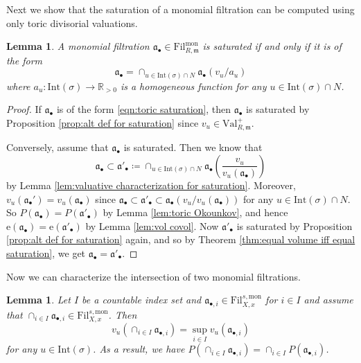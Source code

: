 \documentclass[11pt, leqno]{amsart}%
\theoremstyle{plain}
\newtheorem{lemma}[theorem]{Lemma}
\theoremstyle{definition}
\theoremstyle{remark}
\newcommand{\bR}{\mathbb{R}}
\newcommand{\fa}{\mathfrak{a}}
\newcommand{\fm}{\mathfrak{m}}
\newcommand{\Int}{\mathrm{Int}}
\newcommand{\Val}{\mathrm{Val}}
\newcommand{\e}{\mathrm{e}}
\newcommand{\Fil}{\mathrm{Fil}}
\numberwithin{equation}{section}
\begin{document}
Next we show that the saturation of a monomial filtration can be computed using only toric divisorial valuations.

\begin{lemma}\label{lem:toric saturation}
    A monomial filtration $\fa_\bullet\in\Fil^\mathrm{mon}_{R,\fm}$ is saturated if and only if it is of the form 
    \begin{equation}\label{eqn:toric saturation}
        \fa_\bullet=\cap_{u\in\Int(\sigma)\cap N}\fa_\bullet(v_u/a_u)
    \end{equation}
    where $a_u:\Int(\sigma)\to\bR_{>0}$ is a homogeneous function for any $u\in \Int(\sigma)\cap N$.
\end{lemma}

\begin{proof}
    If $\fa_\bullet$ is of the form \eqref{eqn:toric saturation}, then $\fa_\bullet$ is saturated by Proposition \ref{prop:alt def for saturation} since $v_u\in\Val^+_{R,\fm}$.

    Conversely, assume that $\fa_\bullet$ is saturated. Then we know that 
    \[
        \fa_\bullet\subset \fa'_\bullet\coloneqq\cap_{u\in\Int(\sigma)\cap N} \fa_\bullet(\frac{v_u}{v_u(\fa_\bullet)})
    \]
    by Lemma \ref{lem:valuative characterization for saturation}. Moreover, $v_u(\fa_\bullet')=v_u(\fa_\bullet)$ since $\fa_\bullet\subset\fa'_\bullet\subset\fa_\bullet(v_u/v_u(\fa_\bullet))$ for any $u\in \Int(\sigma)\cap N$. So $P(\fa_\bullet)=P(\fa'_\bullet)$ by Lemma \ref{lem:toric Okounkov}, and hence $\e(\fa_\bullet)=\e(\fa'_\bullet)$ by Lemma \ref{lem:vol covol}. Now $\fa'_\bullet$ is saturated by Proposition \ref{prop:alt def for saturation} again, and so by Theorem \ref{thm:equal volume iff equal saturation}, we get $\fa_\bullet=\fa'_\bullet$. 
\end{proof}

Now we can characterize the intersection of two monomial filtrations.

\begin{lemma}\label{lem:toric intersection}
    Let $I$ be a countable index set and $\fa_{\bullet,i}\in\Fil^{s,\mathrm{mon}}_{X,x}$ for $i\in I$ and assume that $\cap_{i\in I}\fa_{\bullet,i}\in\Fil^{s,\mathrm{mon}}_{X,x}$. Then 
    \begin{equation}\label{eqn:toric intersection}
        v_u(\cap_{i\in I}\fa_{\bullet,i})=\sup_{i\in I}v_u(\fa_{\bullet,i})
    \end{equation}
    for any $u\in\Int(\sigma)$. As a result, we have
    $P(\cap_{i\in I}\fa_{\bullet,i})=\cap_{i\in I} P(\fa_{\bullet,i})$.
\end{lemma}
\end{document}
